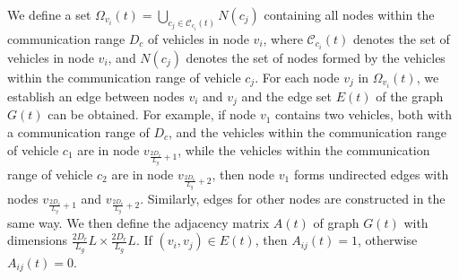 \documentclass[lettersize,journal,onecolumn]{IEEEtran}
\begin{document}
We define a set ${{\Omega }_{{{v}_{i}}}}\left( t \right)=\bigcup\limits_{{{c}_{j}}\in {{\mathcal{C}}_{{{c}_{i}}}}\left( t \right)}{N}({{c}_{j}})$ containing all nodes within the communication range ${{{D}}_{c}}$ of vehicles in node ${{v}_{i}}$, where ${{\mathcal{C}}_{{{c}_{i}}}}\left( {t} \right)$ denotes the set of vehicles in node ${{v}_{i}}$, and $N({{c_j}})$ denotes the set of nodes formed by the vehicles within the communication range of vehicle ${{c_j}}$. 
For each node ${{v}_{j}}$ in ${{\Omega }_{{{v}_{i}}}}\left( t \right)$, we establish an edge between nodes ${{v}_{i}}$ and ${{v}_{j}}$ and the edge set $E(t)$ of the graph $G(t)$ can be obtained. 
For example, if node ${{v}_{1}}$ contains two vehicles, both with a communication range of ${{{D}}_{c}}$, and the vehicles within the communication range of vehicle ${{c}_{1}}$ are in node ${{v}_{\frac{2{{D}_{r}}}{{{L}_{g}}}+1}}$, while the vehicles within the communication range of vehicle ${{c}_{2}}$ are in node ${{v}_{\frac{2{{D}_{r}}}{{{L}_{g}}}+2}}$, then node ${{v}_{1}}$ forms undirected edges with nodes ${{v}_{\frac{2{{D}_{r}}}{{{L}_{g}}}+1}}$ and ${{v}_{\frac{2{{D}_{r}}}{{{L}_{g}}}+2}}$. Similarly, edges for other nodes are constructed in the same way. We then define the adjacency matrix $A(t)$ of graph $G(t)$ with dimensions $\frac{2{{D}_{r}}}{{{L}_{g}}}L\times \frac{2{{D}_{r}}}{{{L}_{g}}}L$. If $({{v}_{i}},{{v}_{j}})\in E(t)$, then ${{A}_{ij}(t)}=1$, otherwise ${{A}_{ij}(t)}=0$.
\end{document}
